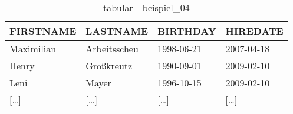 \begin{table}[H]
  \ttfamily
  \begin{tabular}{l|l|l|l}
    \cellcolor{light-grey} \textbf{FIRSTNAME} & \textbf{LASTNAME} & \textbf{BIRTHDAY} & \cellcolor{grey} \textbf{HIREDATE} \\
    \hline\hline
    Maximilian & Arbeitsscheu & \cellcolor{orange}1998-06-21 & 2007-04-18 \\
    Henry & \cellcolor{red} Großkreutz & 1990-09-01 & 2009-02-10 \\
    \cellcolor{green} Leni & Mayer & 1996-10-15 & \cellcolor{blue} 2009-02-10 \\
    $[$\dots$]$ & \cellcolor{yellow} $[$\dots$]$ & \cellcolor{brown} $[$\dots$]$ & $[$\dots$]$ \\
  \end{tabular}
  \caption{tabular - beispiel\_04}
  \label{tbl:beispiel_04}
\end{table}
